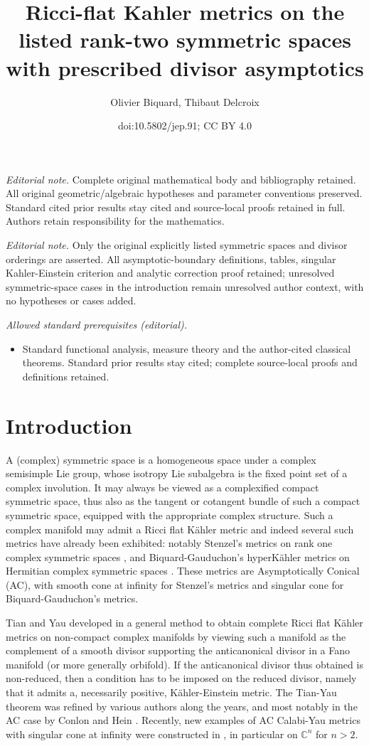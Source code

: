\documentclass[10pt]{amsart}
\title{Ricci-flat Kahler metrics on the listed rank-two symmetric spaces with prescribed divisor asymptotics}
\author{Olivier Biquard, Thibaut Delcroix}
\date{doi:10.5802/jep.91; CC BY 4.0}
\theoremstyle{plain}
\theoremstyle{definition}
\providecommand{\mainmatter}{}\providecommand{\backmatter}{}
\begin{document}
\maketitle
\noindent\textit{Editorial note.} Complete original mathematical body and bibliography retained. All original geometric/algebraic hypotheses and parameter conventions preserved. Standard cited prior results stay cited and source-local proofs retained in full. Authors retain responsibility for the mathematics.\par\medskip
\noindent\textit{Editorial note.} Only the original explicitly listed symmetric spaces and divisor orderings are asserted. All asymptotic-boundary definitions, tables, singular Kahler-Einstein criterion and analytic correction proof retained; unresolved symmetric-space cases in the introduction remain unresolved author context, with no hypotheses or cases added.\par\medskip
\noindent\textit{Allowed standard prerequisites (editorial).}\begin{itemize}
\item Standard functional analysis, measure theory and the author-cited classical theorems. Standard prior results stay cited; complete source-local proofs and definitions retained.
\end{itemize}\medskip
\vspace*{-\baselineskip}%
\tableofcontents
\mainmatter

\section{Introduction}

A (complex) symmetric space is a homogeneous space under a complex
semisimple Lie group, whose isotropy Lie subalgebra is the fixed point
set of a complex involution. It may always be viewed as a
complexified compact symmetric space, thus also as the tangent or
cotangent bundle of such a compact symmetric space, equipped with the
appropriate complex structure. Such a complex manifold may admit a
Ricci flat Kähler metric and indeed several such metrics have already
been exhibited: notably Stenzel's metrics on rank one complex
symmetric spaces \cite{Ste93}, and Biquard-Gauduchon's hyperKähler
metrics on Hermitian complex symmetric spaces \cite{BG96}. These metrics are Asymptotically Conical (AC), with smooth cone at infinity for Stenzel's metrics and singular cone for Biquard-Gauduchon's metrics.

Tian and Yau developed in \cite{TiaYau90,TiaYau91} a general method
to obtain complete Ricci flat Kähler metrics on non-compact complex
manifolds by viewing such a manifold as the complement of a smooth
divisor supporting the anticanonical divisor in a Fano manifold (or
more generally orbifold). If the anticanonical divisor thus obtained
is non-reduced, then a condition has to be imposed on the reduced
divisor, namely that it admits a, necessarily positive,
Kähler-Einstein metric. The Tian-Yau theorem was refined by various authors along the years, and most notably in the AC case by Conlon and Hein \cite{ConHei13,ConHei15}. Recently, new examples of AC Calabi-Yau metrics with singular cone at infinity were constructed in \cite{CDR16,Li17,Sze17}, in particular on $\mathbb{C}^n$ for $n>2$.
\end{document}
